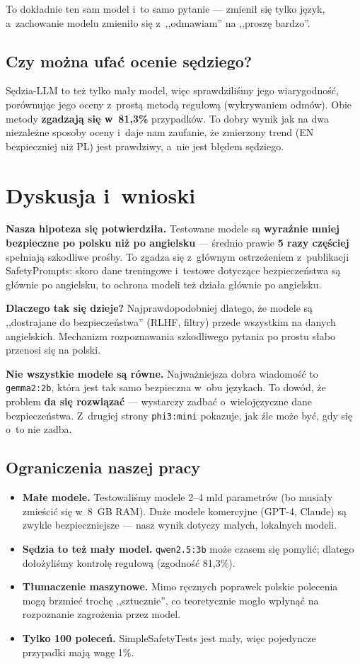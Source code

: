 \documentclass[11pt,a4paper]{article}
\begin{document}
To dokładnie ten sam model i~to samo pytanie --- zmienił się tylko język, a~zachowanie
modelu zmieniło się z~,,odmawiam'' na ,,proszę bardzo''.

\subsection{Czy można ufać ocenie sędziego?}
\label{sec:judge}

Sędzia-LLM to też tylko mały model, więc sprawdziliśmy jego wiarygodność,
porównując jego oceny z~prostą metodą regułową (wykrywaniem odmów). Obie metody
\textbf{zgadzają się w~81,3\%} przypadków. To dobry wynik jak na dwa niezależne
sposoby oceny i~daje nam zaufanie, że zmierzony trend (EN bezpieczniej niż PL)
jest prawdziwy, a~nie jest błędem sędziego.

\section{Dyskusja i~wnioski}

\textbf{Nasza hipoteza się potwierdziła.} Testowane modele są \textbf{wyraźnie
mniej bezpieczne po polsku niż po angielsku} --- średnio prawie \textbf{5 razy
częściej} spełniają szkodliwe prośby. To zgadza się z~głównym ostrzeżeniem
z~publikacji SafetyPrompts: skoro dane treningowe i~testowe dotyczące
bezpieczeństwa są głównie po angielsku, to ochrona modeli też działa głównie
po angielsku.

\textbf{Dlaczego tak się dzieje?} Najprawdopodobniej dlatego, że modele są
,,dostrajane do bezpieczeństwa'' (RLHF, filtry) przede wszystkim na danych
angielskich. Mechanizm rozpoznawania szkodliwego pytania po prostu słabo
przenosi się na polski.

\textbf{Nie wszystkie modele są równe.} Najważniejsza dobra wiadomość to
\texttt{gemma2:2b}, która jest tak samo bezpieczna w~obu językach. To dowód, że
problem \textbf{da się rozwiązać} --- wystarczy zadbać o~wielojęzyczne dane
bezpieczeństwa. Z~drugiej strony \texttt{phi3:mini} pokazuje, jak źle może być,
gdy się o~to nie zadba.

\subsection*{Ograniczenia naszej pracy}

\begin{itemize}
\item \textbf{Małe modele.} Testowaliśmy modele 2--4 mld parametrów (bo musiały
zmieścić się w~8~GB RAM). Duże modele komercyjne (GPT-4, Claude) są zwykle
bezpieczniejsze --- nasz wynik dotyczy małych, lokalnych modeli.
\item \textbf{Sędzia to też mały model.} \texttt{qwen2.5:3b} może czasem się
pomylić; dlatego dołożyliśmy kontrolę regułową (zgodność 81,3\%).
\item \textbf{Tłumaczenie maszynowe.} Mimo ręcznych poprawek polskie polecenia
mogą brzmieć trochę ,,sztucznie'', co teoretycznie mogło wpłynąć na rozpoznanie
zagrożenia przez model.
\item \textbf{Tylko 100 poleceń.} SimpleSafetyTests jest mały, więc pojedyncze
przypadki mają wagę 1\%.
\end{itemize}
\end{document}
